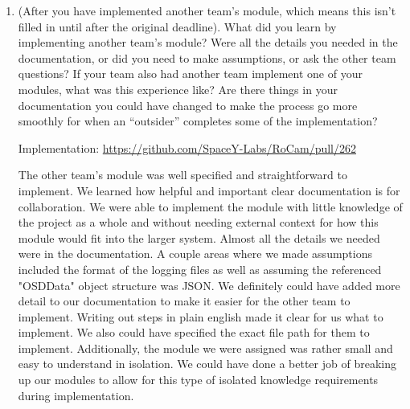 \documentclass[12pt, titlepage]{article}
\begin{document}
\begin{enumerate}
\begin{itemize}
\item The benefits of a primary text based note taker was that it would be easier to code and much more intuitive to users who have used similar software such as notepad or word. However, making it too text focused makes it too similar to the above mentioned programs making ours not valuable for those that can access these other common actions. 

\item Another solution we considered was using alternative input methods such as the microphone to gather input along with the keyboard. It could transcribe the lecture while giving the user the ability to input.  While it would be helpful in gathering information for the note taker, it would also fall outside of our primary goals for the project and could only be considered a stretch goal that could be pursued after the primary goal of the project is properly implemented. 

\end{itemize}
  \item (After you have implemented another team's module, which means this
  isn't filled in until after the original deadline). What did you learn by
  implementing another team's module? Were all the details you needed in the
  documentation, or did you need to make assumptions, or ask the other team
  questions?  If your team also had another team implement one of your modules,
  what was this experience like?  Are there things in your documentation you
  could have changed to make the process go more smoothly for when an
  ``outsider'' completes some of the implementation?

  Implementation: \url{https://github.com/SpaceY-Labs/RoCam/pull/262}


  The other team's module was well specified and straightforward to implement.
  We learned how helpful and important clear documentation is for
  collaboration. We were able to implement the module with little knowledge of
  the project as a whole and without needing external context for how this
  module would fit into the larger system. Almost all the details we needed
  were in the documentation. A couple areas where we made assumptions included
  the format of the logging files as well as assuming the referenced "OSDData"
  object structure was JSON. We definitely could have added more detail to our
  documentation to make it easier for the other team to implement. Writing out
  steps in plain english made it clear for us what to implement. We also could
  have specified the exact file path for them to implement. Additionally, the
  module we were assigned was rather small and easy to understand in isolation.
  We could have done a better job of breaking up our modules to allow for this
  type of isolated knowledge requirements during implementation.

\end{enumerate}
\end{document}

